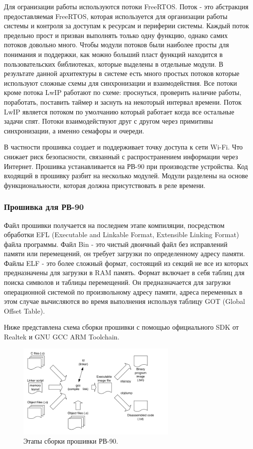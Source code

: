 Для огранизации работы используются потоки FreeRTOS. Поток - это абстракция предоставляемая FreeRTOS, которая используется для организации работы системы и контроля за доступам к ресурсам и периферии системы. Каждый поток предельно прост и призван выполнять только одну функцию, однако самих потоков довольно много. Чтобы модули потоков были наиболее просты для понимания и поддержки, как можно больший пласт функций находится в пользовательских библиотеках, которые выделены в отдельные модули. В результате данной архитектуры в системе есть много простых потоков которые используют сложные схемы для синхронизации и взаимодействия. Все потоки кроме потока LwIP работают по схеме: проснуться, проверить наличие работы, поработать, поставить таймер и заснуть на некоторый интервал времени. Поток LwIP является потоком по умолчанию который работает когда все остальные задачи спят. Потоки взаимодействуют друг с другом через примитивы синхронизации, а именно семафоры и очереди.

В частности прошивка создает и поддерживает точку доступа к сети Wi-Fi. Что снижает риск безопасности, связанный с распространением информации через Интернет. 
Прошивка устанавливается на РВ-90 при производстве устройства. Код входящий в прошивку разбит на несколько модулей. Модули разделены на основе функциональности, которая должна присутствовать в реле времени.


\subsubsection{ Прошивка для РВ-90 }
Файл прошивки получается на последнем этапе компиляции, посредством обработки EFL (Executable and Linkable Format, Extensible Linking Format) файла программы. 
Файл Bin - это чистый двоичный файл без исправлений памяти или перемещений, он требует загрузки по определенному адресу памяти.
Файлы ELF - это более сложный формат, состоящий из секций не все из которых предназначены для загрузки в RAM память. Формат включает в себя таблиц для поиска символов и таблицы перемещений. Он предназначается для загрузки операционной системой по произвольному адресу памяти, адреса переменных в этом случае вычисляются во время выполнения используя таблицу GOT (Global Offset Table). 

Ниже представлена схема сборки прошивки с помощью официального SDK от Realtek и GNU GCC ARM Toolchain.
 
\begin{figure}[h!]
    \centering
    \includegraphics[width=0.7\textwidth]{compilation_steps_firmware.png}
    \caption{Этапы сборки прошивки РВ-90.}
\end{figure}


